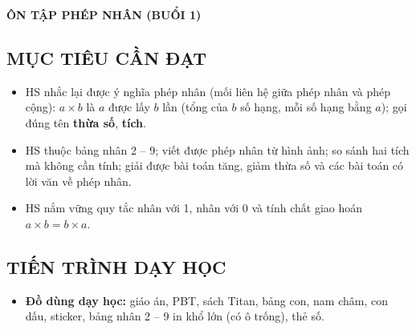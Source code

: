 \documentclass[../main.tex]{subfiles}
\begin{document}
\renewcommand{\lop}{B}
\par\medskip
\begin{center}
        {\color{mauchinh!120}\bfseries\Large ÔN TẬP PHÉP NHÂN (BUỔI 1)}
\end{center}

\subsection{MỤC TIÊU CẦN ĐẠT}
\begin{itemize}
    \item HS nhắc lại được ý nghĩa phép nhân (mối liên hệ giữa phép nhân và phép cộng): $a \times b$ là $a$ được lấy $b$ lần (tổng của $b$ số hạng, mỗi số hạng bằng $a$); gọi đúng tên \textbf{thừa số}, \textbf{tích}.
    \item HS thuộc bảng nhân 2 -- 9; viết được phép nhân từ hình ảnh; so sánh hai tích mà không cần tính; giải được bài toán tăng, giảm thừa số và các bài toán có lời văn về phép nhân.
    \item HS nắm vững quy tắc nhân với 1, nhân với 0 và tính chất giao hoán $a \times b = b \times a$.
\end{itemize}

\subsection{TIẾN TRÌNH DẠY HỌC}
\begin{itemize}
    \item \textbf{Đồ dùng dạy học:} giáo án, PBT, sách Titan, bảng con, nam châm, con dấu, sticker, bảng nhân 2 -- 9 in khổ lớn (có ô trống), thẻ số.
\end{itemize}
\vspace{2pt}
\end{document}
